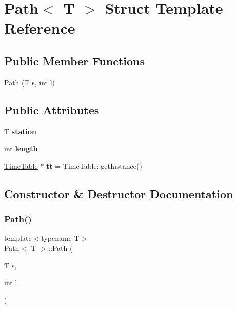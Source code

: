 \hypertarget{struct_path}{}\section{Path$<$ T $>$ Struct Template Reference}
\label{struct_path}
\subsection*{Public Member Functions}
\begin{DoxyCompactItemize}
\item 
\mbox{\hyperlink{struct_path_ad298f0649669ad7365d60703b13c9576}{Path}} (T s, int l)
\end{DoxyCompactItemize}
\subsection*{Public Attributes}
\begin{DoxyCompactItemize}
\item 
\mbox{\label{struct_path_a07be19a1b11adfb55f0a2ceec600691c}} 
T {\bfseries station}
\item 
\mbox{\label{struct_path_ad15edbbd948f0d00ad937b804c6aed04}} 
int {\bfseries length}
\item 
\mbox{\label{struct_path_a31b1efe02f0bf5b7b912b9a6350a8f3a}} 
\mbox{\hyperlink{class_time_table}{Time\+Table}} $\ast$ {\bfseries tt} = Time\+Table\+::get\+Instance()
\end{DoxyCompactItemize}


\subsection{Constructor \& Destructor Documentation}
\mbox{\label{struct_path_ad298f0649669ad7365d60703b13c9576}} 
\subsubsection{\texorpdfstring{Path()}{Path()}}
{\footnotesize\ttfamily template$<$typename T$>$ \\
\mbox{\hyperlink{struct_path}{Path}}$<$ T $>$\+::\mbox{\hyperlink{struct_path}{Path}} (\begin{DoxyParamCaption}\item[{T}]{s,  }\item[{int}]{l }\end{DoxyParamCaption})\hspace{0.3cm}{\ttfamily [inline]}}

